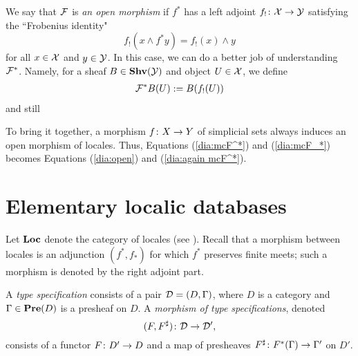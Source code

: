 \documentclass{amsart}
\def\Loc{{\bf Loc}}
\def\meet{\wedge}
\begin{document}
We say that $\mathcal{F}$ is {\em an open morphism} if $f^*$ has a left adjoint $f_!\colon\mathcal{X}\rightarrow\mathcal{Y}$ satisfying the ``Frobenius identity" $$f_!(x\meet f^*y)=f_!(x)\meet y$$ for all $x\in\mathcal{X}$ and $y\in\mathcal{Y}$.  In this case, we can do a better job of understanding $\mathcal{F}^*$.   Namely, for a sheaf $B\in{\bf Shv}(\mathcal{Y})$ and object $U\in\mathcal{X}$, we define \begin{align}\label{dia:open}\mathcal{F}^*B(U):=B(f_!(U))\end{align} and still 

To bring it together, a morphism $f\colon X\rightarrow Y$ of simplicial sets always induces an open morphism of locales.  Thus, Equations (\ref{dia:mcF^*}) and (\ref{dia:mcF_*}) becomes Equations (\ref{dia:open}) and (\ref{dia:again mcF^*}).


\section{Elementary localic databases}

Let $\Loc$ denote the category of locales (see \cite{Bor3}).  Recall that a morphism between locales is an adjunction $(f^*,f_*)$ for which $f^*$ preserves finite meets; such a morphism is denoted by the right adjoint part.

\begin{definition}

A {\em type specification} consists of a pair $\mathcal{D}=(D,\Gamma)$, where $D$ is a category and $\Gamma\in{\bf Pre}(D)$ is a presheaf on $D$.  A {\em morphism of type specifications}, denoted $$(F,F^\sharp)\colon\mathcal{D}\rightarrow\mathcal{D}',$$ consists of a functor $F\colon D'\rightarrow D$ and a map of presheaves $F^\sharp\colon F^*(\Gamma)\rightarrow\Gamma'$ on $D'$.  

\end{definition}
\end{document}
